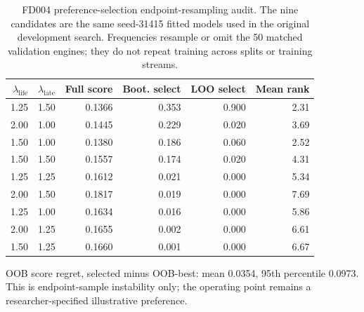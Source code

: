 \begin{table}[!t]
\centering
\scriptsize
\caption{FD004 preference-selection endpoint-resampling audit. The nine candidates are the same seed-31415 fitted models used in the original development search. Frequencies resample or omit the 50 matched validation engines; they do not repeat training across splits or training streams.}
\label{tab:preference-selection-stability}
\begin{tabular}{rrrrrr}
\toprule
$\lambda_{\mathrm{life}}$ & $\lambda_{\mathrm{late}}$ & Full score & Boot. select & LOO select & Mean rank \\
\midrule
1.25 & 1.50 & 0.1366 & 0.353 & 0.900 & 2.31 \\
2.00 & 1.00 & 0.1445 & 0.229 & 0.020 & 3.69 \\
1.50 & 1.00 & 0.1380 & 0.186 & 0.060 & 2.52 \\
1.50 & 1.50 & 0.1557 & 0.174 & 0.020 & 4.31 \\
1.25 & 1.25 & 0.1612 & 0.021 & 0.000 & 5.34 \\
2.00 & 1.50 & 0.1817 & 0.019 & 0.000 & 7.69 \\
1.25 & 1.00 & 0.1634 & 0.016 & 0.000 & 5.86 \\
2.00 & 1.25 & 0.1655 & 0.002 & 0.000 & 6.61 \\
1.50 & 1.25 & 0.1660 & 0.001 & 0.000 & 6.67 \\
\bottomrule
\end{tabular}
\par\footnotesize OOB score regret, selected minus OOB-best: mean 0.0354, 95th percentile 0.0973. This is endpoint-sample instability only; the operating point remains a researcher-specified illustrative preference.
\end{table}
